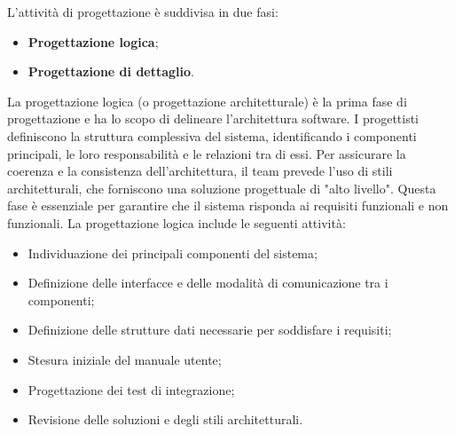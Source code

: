 \label{fasi-progettazione}
\par L'attività di progettazione è suddivisa in due fasi: 
\begin{itemize}
  \item \textbf{Progettazione logica};
  \item \textbf{Progettazione di dettaglio}.
\end{itemize}

\label{progettazione-logica}
\par La progettazione logica (o progettazione architetturale) è la prima fase di progettazione e ha lo scopo di delineare l'architettura software. I progettisti definiscono la struttura complessiva del sistema, identificando i componenti principali, le loro responsabilità e le relazioni tra di essi. Per assicurare la coerenza e la consistenza dell'architettura, il team prevede l'uso di stili architetturali, che forniscono una soluzione progettuale di "alto livello". Questa fase è essenziale per garantire che il sistema risponda ai requisiti funzionali e non funzionali. La progettazione logica include le seguenti attività:
\begin{itemize}
  \item Individuazione dei principali componenti del sistema;
  \item Definizione delle interfacce e delle modalità di comunicazione tra i componenti;
  \item Definizione delle strutture dati necessarie per soddisfare i requisiti;
  \item Stesura iniziale del manuale utente;
  \item Progettazione dei test di integrazione;
  \item Revisione delle soluzioni e degli stili architetturali.
\end{itemize}

